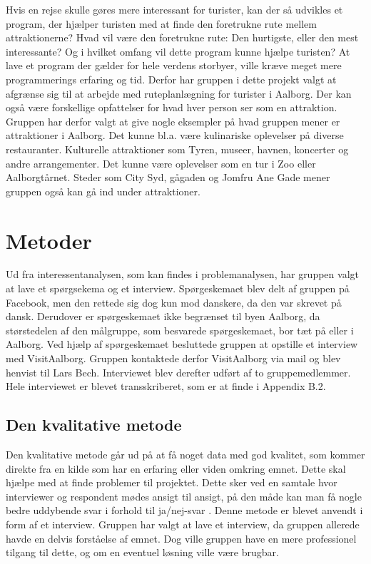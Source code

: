 Hvis en rejse skulle gøres mere interessant for turister, kan der så udvikles et program, der hjælper turisten med at finde den foretrukne rute mellem attraktionerne? Hvad vil være den foretrukne rute: Den hurtigste, eller den mest interessante? Og i hvilket omfang vil dette program kunne hjælpe turisten? \newline
At lave et program der gælder for hele verdens storbyer, ville kræve meget mere programmerings erfaring og tid. Derfor har gruppen i dette projekt valgt at afgrænse sig til at arbejde med ruteplanlægning for turister i Aalborg. Der kan også være forskellige opfattelser for hvad hver person ser som en attraktion. Gruppen har derfor valgt at give nogle eksempler på hvad gruppen mener er attraktioner i Aalborg. Det kunne bl.a. være kulinariske oplevelser på diverse restauranter. Kulturelle attraktioner som Tyren, museer, havnen, koncerter og andre arrangementer. Det kunne være oplevelser som en tur i Zoo eller Aalborgtårnet. Steder som City Syd, gågaden og Jomfru Ane Gade mener gruppen også kan gå ind under attraktioner.

\section{Metoder}
Ud fra interessentanalysen, som kan findes i problemanalysen, har gruppen valgt at lave et spørgsekema og et interview. Spørgeskemaet blev delt af gruppen på Facebook, men den rettede sig dog kun mod danskere, da den var skrevet på dansk. Derudover er spørgeskemaet ikke begrænset til byen Aalborg, da størstedelen af den målgruppe, som besvarede spørgeskemaet, bor tæt på eller i Aalborg. \newline
Ved hjælp af spørgeskemaet besluttede gruppen at opstille et interview med VisitAalborg. Gruppen kontaktede derfor VisitAalborg via mail og blev henvist til Lars Bech. Interviewet blev derefter udført af to gruppemedlemmer. Hele interviewet er blevet transskriberet, som er at finde i Appendix B.2. 

\subsection{Den kvalitative metode}
Den kvalitative metode går ud på at få noget data med god kvalitet, som kommer direkte fra en kilde som har en erfaring eller viden omkring emnet. Dette skal hjælpe med at finde problemer til projektet. Dette sker ved en samtale hvor interviewer og respondent mødes ansigt til ansigt, på den måde kan man få nogle bedre uddybende svar i forhold til ja/nej-svar \citep{kvalitativ}. 
Denne metode er blevet anvendt i form af et interview. Gruppen har valgt at lave et interview, da gruppen allerede havde en delvis forståelse af emnet. Dog ville gruppen have en mere professionel tilgang til dette,  og om en eventuel løsning ville være brugbar.

